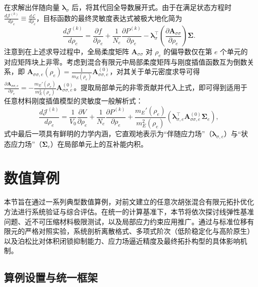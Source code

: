 在求解出伴随向量 $\boldsymbol{\lambda}_\sigma$ 后，将其代回全导数展开式。由于在满足状态方程时 $\frac{d \mathcal{J}^{(k)}}{d \rho_e} \equiv \frac{d \mathcal{L}}{d \rho_e}$，目标函数的最终灵敏度表达式被极大地化简为
\[
\frac{d \mathcal{J}^{(k)}}{d \rho_e} = \frac{\partial f}{\partial \rho_e} + \frac{1}{N_e} \frac{\partial P^{(k)}}{\partial \rho_e} - \boldsymbol{\lambda}_\sigma^{\top} \left( \frac{\partial \boldsymbol{A}_{\sigma\sigma}}{\partial \rho_e} \right) \boldsymbol{\Sigma}.
\]
注意到在上述求导过程中，全局柔度矩阵 $\boldsymbol{A}_{\sigma\sigma}$ 对 $\rho_e$ 的偏导数仅在第 $e$ 个单元的对应矩阵块上非零。考虑到混合有限元中局部柔度矩阵与刚度插值函数互为倒数关系，即 $\boldsymbol{A}_{\sigma\sigma, e}(\rho_e) = \frac{1}{m_E(\rho_e)} \boldsymbol{A}_{\sigma\sigma, e}^{(0)}$，对其关于单元密度求导可得 $\frac{\partial \boldsymbol{A}_{\sigma\sigma, e}}{\partial \rho_e} = - \frac{m_E'(\rho_e)}{m_E^2(\rho_e)} \boldsymbol{A}_{\sigma\sigma, e}^{(0)}$。提取局部单元的非零贡献并代入上式，即可得到适用于任意材料刚度插值模型的灵敏度一般解析式：
\begin{equation} \label{eq:ch5_hz_stress_final_sensitivity}
	\frac{d \mathcal{J}^{(k)}}{d \rho_e} = \frac{1}{V_0} \frac{\partial V}{\partial \rho_e} + \frac{1}{N_e} \frac{\partial P^{(k)}}{\partial \rho_e} + \frac{m_E'(\rho_e)}{m_E^2(\rho_e)} \left( \boldsymbol{\lambda}_{\sigma, e}^{\top} \boldsymbol{A}_{\sigma\sigma, e}^{(0)} \boldsymbol{\Sigma}_e \right),
\end{equation}
式中最后一项具有鲜明的力学内涵，它直观地表示为“伴随应力场”（$\boldsymbol{\lambda}_{\sigma, e}$）与“状态应力场”（$\boldsymbol{\Sigma}_e$）在局部单元上的互补能内积。


\section{数值算例}
\label{sec:hz_numerical_examples}

本节旨在通过一系列典型数值算例，对前文建立的任意次胡张混合有限元拓扑优化方法进行系统验证与综合评估。在统一的计算基准下，本节将依次探讨线弹性基准问题、近不可压缩材料极限测试，以及局部应力约束应用推广。通过与标准位移有限元的严格对照实验，系统剖析离散格式、多项式阶次（低阶稳定化与高阶原生）以及泊松比对体积闭锁抑制能力、应力场逼近精度及最终拓扑构型的具体影响机制。

\subsection{算例设置与统一框架}
\label{subsec:hz_setup_framework}

